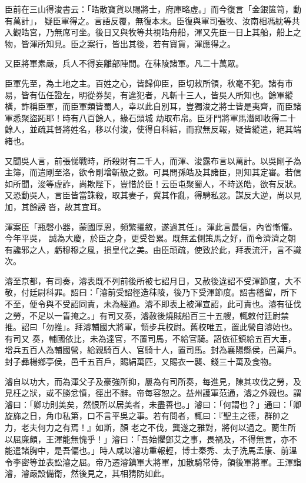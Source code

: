 \begin{pinyinscope}
 臣前在三山得浚書云：「皓散寶貨以賜將士，府庫略虛。」而今復言「金銀篋笥，動有萬計」，
 疑臣軍得之。言語反覆，無復本末。臣復與軍司張牧、汝南相馮紞等共入觀皓宮，乃無席可坐。後日又與牧等共視皓舟船，渾又先臣一日上其船，船上之物，皆渾所知見。臣之案行，皆出其後，若有寶貨，渾應得之。



 又臣將軍素嚴，兵人不得妄離部陣間。在秣陵諸軍。凡二十萬眾。



 臣軍先至，為土地之主。百姓之心，皆歸仰臣，臣切敕所領，秋毫不犯。諸有市易，皆有伍任證左，明從券契，有違犯者，凡斬十三人，皆吳人所知也。餘軍縱橫，詐稱臣軍，而臣軍類皆蜀人，幸以此自別耳，豈獨浚之將士皆是夷齊，而臣諸軍悉聚盜跖耶！時有八百餘人，緣石頭城
 劫取布帛。臣牙門將軍馬潛即收得二十餘人，並疏其督將姓名，移以付浚，使得自科結，而寂無反報，疑皆縱遣，絕其端緒也。



 又聞吳人言，前張悌戰時，所殺財有二千人，而渾、浚露布言以萬計。以吳剛子為主簿，而遣剛至洛，欲令剛增斬級之數。可具問孫皓及其諸臣，則知其定審。若信如所聞，浚等虛詐，尚欺陛下，豈惜於臣！云臣屯聚蜀人，不時送皓，欲有反狀。又恐動吳人，言臣皆當誅殺，取其妻子，冀其作亂，得騁私忿。謀反大逆，尚以見加，其餘謗沓，故其宜耳。



 渾案臣「瓶磬小器，蒙國厚恩，頻繁擢敘，遂過其任」。渾此言最信，內省慚懼。今年平吳，
 誠為大慶，於臣之身，更受咎累。既無孟側策馬之好，而令濟濟之朝有讒邪之人，虧穆穆之風，損皇代之美。由臣頑疏，使致於此，拜表流汗，言不識次。



 濬至京都，有司奏，濬表既不列前後所被七詔月日，又赦後違詔不受渾節度，大不敬，付廷尉科罪。詔曰：「濬前受詔徑造秣陵，後乃下受渾節度。詔書稽留，所下不至，便令與不受詔同責，未為經通。濬不即表上被渾宣詔，此可責也。濬有征伐之勞，不足以一眚掩之。」有司又奏，濬赦後燒賊船百三十五艘，輒敕付廷尉禁推。詔曰「勿推」。拜濬輔國大將軍，領步兵校尉。舊校唯五，置此營自濬始也。有司又
 奏，輔國依比，未為達官，不置司馬，不給官騎。詔依征鎮給五百大車，增兵五百人為輔國營，給親騎百人、官騎十人，置司馬。封為襄陽縣侯，邑萬戶。封子彝楊鄉亭侯，邑千五百戶，賜絹萬匹，又賜衣一襲、錢三十萬及食物。



 濬自以功大，而為渾父子及豪強所抑，屢為有司所奏，每進見，陳其攻伐之勞，及見枉之狀，或不勝忿憤，徑出不辭。帝每容恕之。益州護軍范通，濬之外親也。謂濬曰：「卿功則美矣，然恨所以居美者，未盡善也。」濬曰：「何謂也？」通曰：「卿旋旆之日，角巾私第，口不言平吳之事。若有問者，輒曰：『聖主之德，群帥之力，老夫何力之有焉！』如斯，顏
 老之不伐，龔遂之雅對，將何以過之。藺生所以屈廉頗，王渾能無愧乎！」濬曰：「吾始懼鄧艾之事，畏禍及，不得無言，亦不能遣諸胸中，是吾偏也。」時人咸以濬功重報輕，博士秦秀、太子洗馬孟康、前溫令李密等並表訟濬之屈。帝乃遷濬鎮軍大將軍，加散騎常侍，領後軍將軍。王渾詣濬，濬嚴設備衛，然後見之，其相猜防如此。




\end{pinyinscope}
